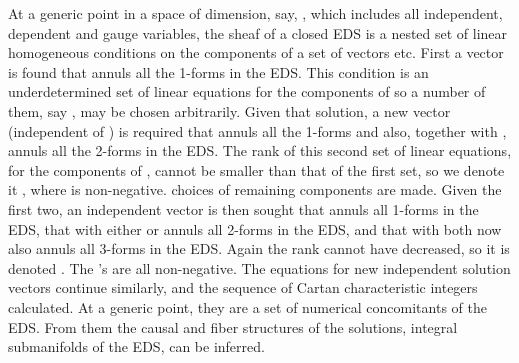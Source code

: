 \documentclass[a4paper,a4paper]{article}
\begin{document}
        At a generic point in a space of dimension,  say,  \coordHE{},  which
includes all independent,  dependent and gauge variables,   the sheaf of
a closed EDS is a nested set of linear homogeneous conditions on the \coordHE{} components of a
set of  vectors \coordHE{} etc.  First a vector \coordHE{}
is found that annuls all the 1-forms in the EDS.  This condition is an
underdetermined set of linear equations for the components of \coordHE{} so
a number of them,  say \coordHE{},  may be chosen arbitrarily.  Given
that solution,  a new vector \coordHE{} (independent of \coordHE{}) is
required that annuls all the 1-forms and also,  together with \coordHE{},
annuls all the 2-forms in the EDS.  The rank of this second set of
linear equations,  for the components of \coordHE{},  cannot be smaller than that
of the first set,  so we denote it \coordHE{},
where \coordHE{} is non-negative.  \coordHE{} choices of remaining
components are made. Given the first two,  an independent vector
\coordHE{}is then sought that annuls all 1-forms in the EDS,  that with either
\coordHE{} or \coordHE{} annuls all 2-forms in the EDS,  and that with both
now also annuls all 3-forms in the EDS.  Again the rank cannot have
decreased,  so it is denoted \coordHE{}.  The \coordHE{}'s
are all non-negative.  The equations for new independent solution
vectors continue similarly,  and the sequence of Cartan characteristic
integers \coordHE{} calculated.  At a generic point,  they are a set of numerical
concomitants of the EDS.  From them the causal and fiber structures of
the solutions,  integral submanifolds of the EDS,  can be inferred.
\end{document}
